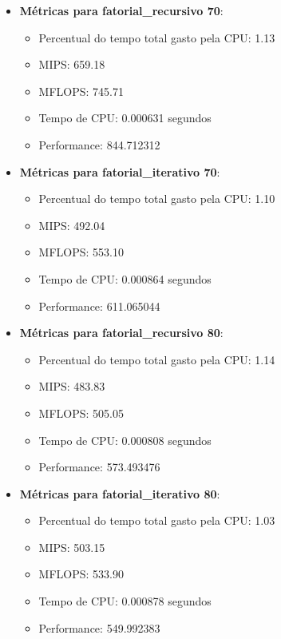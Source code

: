 \documentclass[12pt]{article}
\begin{document}
\begin{itemize}
    \item \textbf{Métricas para fatorial\_recursivo 70}:
    \begin{itemize}
        \item Percentual do tempo total gasto pela CPU: 1.13
        \item MIPS: 659.18
        \item MFLOPS: 745.71
        \item Tempo de CPU: 0.000631 segundos
        \item Performance: 844.712312
    \end{itemize}

    \item \textbf{Métricas para fatorial\_iterativo 70}:
    \begin{itemize}
        \item Percentual do tempo total gasto pela CPU: 1.10
        \item MIPS: 492.04
        \item MFLOPS: 553.10
        \item Tempo de CPU: 0.000864 segundos
        \item Performance: 611.065044
    \end{itemize}

    \item \textbf{Métricas para fatorial\_recursivo 80}:
    \begin{itemize}
        \item Percentual do tempo total gasto pela CPU: 1.14
        \item MIPS: 483.83
        \item MFLOPS: 505.05
        \item Tempo de CPU: 0.000808 segundos
        \item Performance: 573.493476
    \end{itemize}

    \item \textbf{Métricas para fatorial\_iterativo 80}:
    \begin{itemize}
        \item Percentual do tempo total gasto pela CPU: 1.03
        \item MIPS: 503.15
        \item MFLOPS: 533.90
        \item Tempo de CPU: 0.000878 segundos
        \item Performance: 549.992383
    \end{itemize}


\end{itemize}
\end{document}
